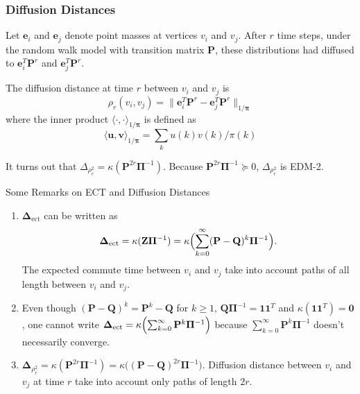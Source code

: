\documentclass[professionalfonts, hyperref={pdfpagelabels=false,
  colorlinks=true, linkcolor=purple}]{beamer}
\begin{document}
\begin{frame}
  \frametitle{Diffusion Distances}
  Let $\bm{e}_i$ and $\bm{e}_j$ denote point masses at vertices $v_i$ and
  $v_j$. After $r$ time steps, under the random walk model with
  transition matrix $\mathbf{P}$, these distributions had diffused to
  $\bm{e}_i^{T} \mathbf{P}^{r}$ and $\bm{e}_j^{T}\mathbf{P}^{r}$. 
  
  \vskip10pt 

  The diffusion distance \cite{coifman06:_diffus_maps} at
  time $r$ between $v_i$ and $v_j$ is
    \begin{equation*}
      \rho_{r}(v_i,v_j) = \| \bm{e}_i^{T} \mathbf{P}^{r} -
      \bm{e}_j^{T}
      \mathbf{P}^{r} \|_{1/\bm{\pi}}
    \end{equation*}
    where the inner product $\langle \cdot, \cdot
    \rangle_{1/\bm{\pi}}$ is defined as
    \begin{equation*}
      \langle \bm{u}, \bm{v} \rangle_{1/\bm{\pi}} = \sum_{k} u(k)
      v(k)/\pi(k)
    \end{equation*}
    
      \vskip10pt
      It turns out that $\Delta_{\rho_{r}^{2}} =
      \kappa(\mathbf{P}^{2r}\bm{\Pi}^{-1})$. 
      Because $\mathbf{P}^{2r}\bm{\Pi}^{-1} \succeq 0$,
      $\Delta_{\rho_{r}^{2}}$ is EDM-2.  
\end{frame}

\begin{frame}{Some Remarks on ECT and Diffusion
  Distances}
  \begin{enumerate}
  \item $\bm{\Delta}_{\mathrm{ect}}$ can be written as
    \begin{equation*}
      \bm{\Delta}_{\mathrm{ect}} = \kappa(\mathbf{Z}\bm{\Pi}^{-1}) =
      \kappa\Bigl( \sum_{k=0}^{\infty}(\mathbf{P} -
      \mathbf{Q})^{k}\bm{\Pi}^{-1}\Bigr).
    \end{equation*}
    The expected commute time between $v_i$ and $v_j$ take into account
    paths of all length between $v_i$ and $v_j$.
  \item Even though $(\mathbf{P} - \mathbf{Q})^{k} =
    \mathbf{P}^{k} - \mathbf{Q}$ for $k \geq 1$,
    $\mathbf{Q}\bm{\Pi}^{-1} = \bm{1}\bm{1}^{T}$ and
    $\kappa(\bm{1}\bm{1}^{T}) = \bm{0}$, one cannot write
    $\bm{\Delta}_{\mathrm{ect}} =
    \kappa\Bigl(\sum_{k=0}^{\infty}\mathbf{P}^{k}\bm{\Pi}^{-1}\Bigr)$
    because $\sum_{k=0}^{\infty}\mathbf{P}^{k}\bm{\Pi}^{-1}$
    doesn't necessarily converge.
  \item $\bm{\Delta}_{\rho_{r}^{2}} =
    \kappa(\mathbf{P}^{2r}\bm{\Pi}^{-1}) = \kappa\bigl((\mathbf{P} -
    \mathbf{Q})^{2r}\bm{\Pi}^{-1}\bigr)$. Diffusion distance between
    $v_i$ and $v_j$ at time $r$ take into account only paths of length
    $2r$.
  \end{enumerate}
\end{frame}
\end{document}
